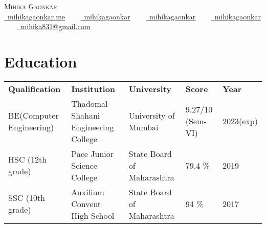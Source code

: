 \documentclass[10pt]{article}
\begin{document}




\begin{center}
    {\HUGE \scshape Mihika Gaonkar} \\ \vspace{5pt}
    \large
    \faGlobe \href{https://mihikagaonkar.me}{\raisebox{-0.1\height}\ mihikagaonkar.me} ~~~
    \faGithub \href{https://github.com/mihikagaonkar}{\raisebox{-0.2\height}\ mihikagaonkar} ~~~
    \faLinkedin \href{https://linkedin.com/in/mihikagaonkar}{\raisebox{-0.2\height}\ mihikagaonkar} ~~~
    \faMedium \href{https://medium.com/@mihikagaonkar}{\raisebox{-0.2\height}\ mihikagaonkar} ~~~
    \faEnvelope \href{mailto:mihika831@gmail.com}{\raisebox{-0.2\height}\  mihika831@gmail.com}
    \vspace{-13pt}
\end{center}







\vspace{2pt}
\section{Education}
    \vspace{2pt}
    \begin{itemize}[leftmargin=-0in,label={}]
        {\item{
            \begin{tabular}{ l@{\hskip 0.2in} l@{\hskip 0.2in} l@{\hskip 0.2in} l@{\hskip 0.2in} l }
                 \textbf{Qualification} & \textbf{Institution} & \textbf{University} & \textbf{Score} & \textbf{Year} \\ 
                 BE(Computer Engineering)  & Thadomal Shahani Engineering College & University of Mumbai & 9.27/10 (Sem-VI) & 2023(exp)\\
                 HSC (12th grade) & Pace Junior Science College & State Board of Maharashtra & 79.4 \% & 2019\\
                 SSC (10th grade) & Auxilium Convent High School & State Board of Maharashtra & 94 \% & 2017
            \end{tabular}
        }}
    \end{itemize}
\vspace{-20pt}
\end{document}
